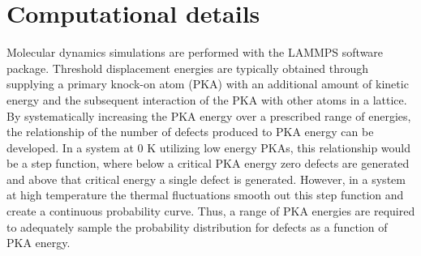 \documentclass[review]{elsarticle} %
\begin{document}
\section{Computational details}

\hspace{5mm}

Molecular dynamics simulations are performed with the LAMMPS \cite{lammps} software package. Threshold displacement energies are typically obtained through supplying a primary knock-on atom (PKA) with an additional amount of kinetic energy and the subsequent interaction of the PKA with other atoms in a lattice. By systematically increasing the PKA energy over a prescribed range of energies, the relationship of the number of defects produced to PKA energy can be developed. In a system at 0 K utilizing low energy PKAs, this relationship would be a step function, where below a critical PKA energy zero defects are generated and above that critical energy a single defect is generated. However, in a system at high temperature the thermal fluctuations smooth out this step function and create a continuous probability curve. Thus, a range of PKA energies are required to adequately sample the probability distribution for defects as a function of PKA energy.
\end{document}
